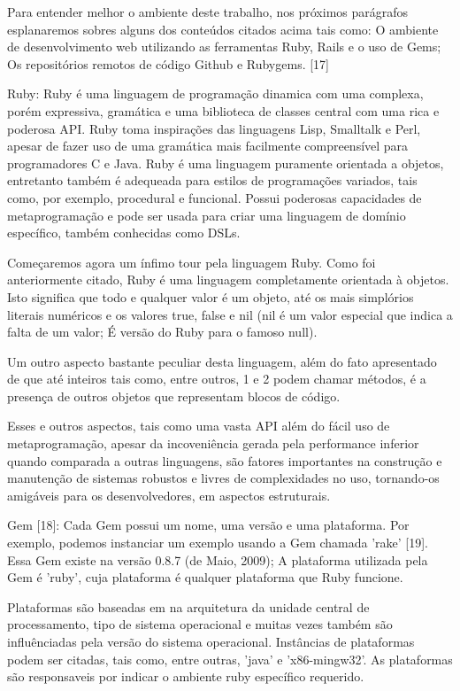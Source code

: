 Para entender melhor o ambiente deste trabalho, nos próximos parágrafos esplanaremos sobres alguns dos conteúdos citados acima tais como: O ambiente de desenvolvimento web utilizando as ferramentas Ruby, Rails e o uso de Gems; Os repositórios remotos de código Github e Rubygems. [17]

Ruby: Ruby é uma linguagem de programação dinamica com uma complexa, porém expressiva, gramática e uma biblioteca de classes central com uma rica e poderosa API. Ruby toma inspirações das linguagens Lisp, Smalltalk e Perl, apesar de fazer uso de uma gramática mais facilmente compreensível para programadores C e Java. Ruby é uma linguagem puramente orientada a objetos, entretanto também é adequeada para estilos de programações variados, tais como, por exemplo, procedural e funcional. Possui poderosas capacidades de metaprogramação e pode ser usada para criar uma linguagem de domínio específico, também conhecidas como DSLs.

Começaremos agora um ínfimo tour pela linguagem Ruby. Como foi anteriormente citado, Ruby é uma linguagem completamente orientada à objetos. Isto significa que todo e qualquer valor é um objeto, até os mais simplórios literais numéricos e os valores true, false e nil (nil é um valor especial que indica a falta de um valor; É versão do Ruby para o famoso null).

Um outro aspecto bastante peculiar desta linguagem, além do fato apresentado de que até inteiros tais como, entre outros, 1 e 2 podem chamar métodos, é a presença de outros objetos que representam blocos de código.

Esses e outros aspectos, tais como uma vasta API além do fácil uso de metaprogramação, apesar da incoveniência gerada pela performance inferior quando comparada a outras linguagens, são fatores importantes na construção e manutenção de sistemas robustos e livres de complexidades no uso, tornando-os amigáveis para os desenvolvedores, em aspectos estruturais.

Gem [18]: Cada Gem possui um nome, uma versão e uma plataforma. Por exemplo, podemos instanciar um exemplo usando a Gem chamada 'rake' [19]. Essa Gem existe na versão 0.8.7 (de Maio, 2009); A plataforma utilizada pela Gem é 'ruby', cuja plataforma é qualquer plataforma que Ruby funcione. 

Plataformas são baseadas em na arquitetura da unidade central de processamento, tipo de sistema operacional e muitas vezes também são influênciadas pela versão do sistema operacional. Instâncias de plataformas podem ser citadas, tais como, entre outras, 'java' e 'x86-mingw32'. As plataformas são responsaveis por indicar o ambiente ruby específico requerido.

